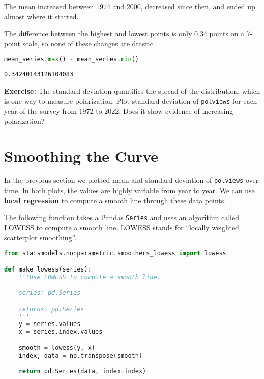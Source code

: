 The mean increased between 1974 and 2000, decreased since then, and
ended up almost where it started.

\pagebreak

The difference between the highest and
lowest points is only 0.34 points on a 7-point scale, so none of these
changes are drastic.

\begin{lstlisting}[language=Python,style=source]
mean_series.max() - mean_series.min()
\end{lstlisting}

\begin{lstlisting}[style=output]
0.34240143126104083
\end{lstlisting}

\textbf{Exercise:} The standard deviation quantifies the spread of the
distribution, which is one way to measure polarization. Plot standard
deviation of \passthrough{\lstinline!polviews!} for each year of the
survey from 1972 to 2022. Does it show evidence of increasing
polarization?

\section{Smoothing the Curve}\label{smoothing-the-curve}

In the previous section we plotted mean and standard deviation of
\passthrough{\lstinline!polviews!} over time. In both plots, the values
are highly variable from year to year. We can use \textbf{local
regression} to compute a smooth line through these data points.

The following function takes a Pandas \passthrough{\lstinline!Series!}
and uses an algorithm called LOWESS to compute a smooth line. LOWESS
stands for ``locally weighted scatterplot smoothing''.

\begin{lstlisting}[language=Python,style=source]
from statsmodels.nonparametric.smoothers_lowess import lowess

def make_lowess(series):
    '''Use LOWESS to compute a smooth line.

    series: pd.Series

    returns: pd.Series
    '''
    y = series.values
    x = series.index.values

    smooth = lowess(y, x)
    index, data = np.transpose(smooth)

    return pd.Series(data, index=index)
\end{lstlisting}

